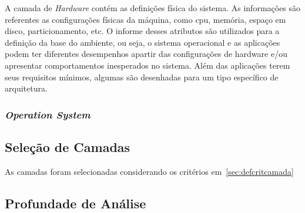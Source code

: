 A camada de \textit{Hardware} contém as definições física do sistema.
As informações são referentes as configurações físicas da máquina, como
cpu, memória, espaço em disco, particionamento, etc. O informe desses atributos
são utilizados para a definição da base do ambiente, ou seja, o sistema
operacional e as aplicações podem ter diferentes desempenhos apartir das
configurações de hardware e/ou apresentar comportamentos inesperados no sistema.
Além das aplicações terem seus requisitos mínimos, algumas são desenhadas
para um tipo específico de arquitetura.


\subsubsection{\textit{Operation System}}
\label{sec:cam-os}

\subsection{Seleção de Camadas}
\label{sec:sel-cam}

As camadas foram selecionadas considerando os critérios em~\ref{sec:defcritcamada}

\subsection{Profundade de Análise}

